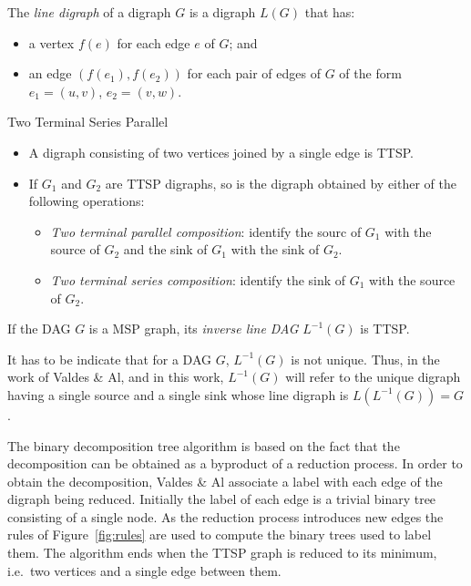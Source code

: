 \begin{mydef}
The \emph{line digraph} of a digraph $G$ is a digraph $L(G)$ that has:
\begin{itemize}
\item a vertex $f(e)$ for each edge $e$ of $G$; and
\item an edge $(f(e_1),f(e_2))$ for each pair of edges of $G$ of the form $e_1=(u,v)$, $e_2=(v,w)$.
\end{itemize}
\end{mydef}

\begin{mydef}Two Terminal Series Parallel
\begin{itemize}
\item A digraph consisting of two vertices joined by a single edge is TTSP.
\item If $G_1$ and $G_2$ are TTSP digraphs, so is the digraph obtained by either of the following operations:
\begin{itemize}
\item \emph{Two terminal parallel composition}: identify the sourc of $G_1$ with the source of $G_2$ and the sink of $G_1$ with the sink of $G_2$.
\item \emph{Two terminal series composition}: identify the sink of $G_1$ with the source of $G_2$.
\end{itemize}
\end{itemize}
\end{mydef}

\begin{myth}
If the DAG $G$ is a MSP graph, its \emph{inverse line DAG} $L^{-1}(G)$ is TTSP.
\end{myth}

It has to be indicate that for a DAG $G$, $L^{-1}(G)$ is not unique. Thus, in the work of Valdes \& Al, and in this work, $L^{-1}(G)$ will refer to the unique digraph having a single source and a single sink whose line digraph is $L(L^{-1}(G))=G$.

The binary decomposition tree algorithm is based on the fact that the decomposition can be obtained as a byproduct of a reduction process. In order to obtain the decomposition, Valdes \& Al associate a label with each edge of the digraph being reduced. Initially the label of each edge is a trivial binary tree consisting of a single node. As the reduction process introduces new edges the rules of Figure~\ref{fig:rules} are used to compute the binary trees used to label them. The algorithm ends when the TTSP graph is reduced to its minimum, i.e.\ two vertices and a single edge between them.

